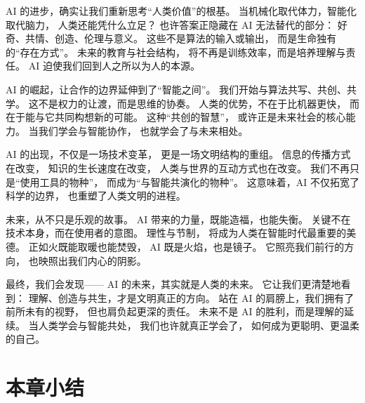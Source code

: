 AI 的进步，确实让我们重新思考“人类价值”的根基。  
当机械化取代体力，智能化取代脑力，  
人类还能凭什么立足？  
也许答案正隐藏在 AI 无法替代的部分：  
好奇、共情、创造、伦理与意义。  
这些不是算法的输入或输出，  
而是生命独有的“存在方式”。  
未来的教育与社会结构，  
将不再是训练效率，而是培养理解与责任。  
AI 迫使我们回到人之所以为人的本源。

AI 的崛起，让合作的边界延伸到了“智能之间”。  
我们开始与算法共写、共创、共学。  
这不是权力的让渡，而是思维的协奏。  
人类的优势，不在于比机器更快，  
而在于能与它共同构想新的可能。  
这种“共创的智慧”，  
或许正是未来社会的核心能力。  
当我们学会与智能协作，  
也就学会了与未来相处。

AI 的出现，不仅是一场技术变革，  
更是一场文明结构的重组。  
信息的传播方式在改变，  
知识的生长速度在改变，  
人类与世界的互动方式也在改变。  
我们不再只是“使用工具的物种”，  
而成为“与智能共演化的物种”。  
这意味着，AI 不仅拓宽了科学的边界，  
也重塑了人类文明的进程。

未来，从不只是乐观的故事。  
AI 带来的力量，既能造福，也能失衡。  
关键不在技术本身，而在使用者的意图。  
理性与节制，  
将成为人类在智能时代最重要的美德。  
正如火既能取暖也能焚毁，  
AI 既是火焰，也是镜子。  
它照亮我们前行的方向，  
也映照出我们内心的阴影。

最终，我们会发现——  
AI 的未来，其实就是人类的未来。  
它让我们更清楚地看到：  
理解、创造与共生，才是文明真正的方向。  
站在 AI 的肩膀上，我们拥有了前所未有的视野，  
但也肩负起更深的责任。  
未来不是 AI 的胜利，而是理解的延续。  
当人类学会与智能共处，  
我们也许就真正学会了，  
如何成为更聪明、更温柔的自己。

\section{本章小结}









